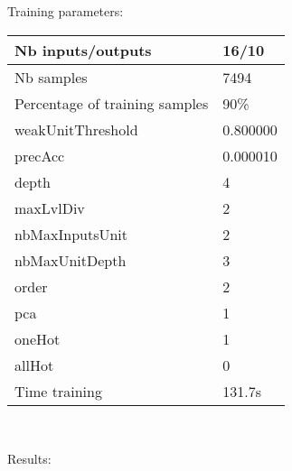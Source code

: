 Training parameters:\\
\begin{center}
\begin{tabular}{|l|l|}
\hline
Nb inputs/outputs&16/10\\
\hline
Nb samples&7494\\
\hline
Percentage of training samples&90\%\\
\hline
weakUnitThreshold&0.800000\\
\hline
precAcc&0.000010\\
\hline
depth&4\\
\hline
maxLvlDiv&2\\
\hline
nbMaxInputsUnit&2\\
\hline
nbMaxUnitDepth&3\\
\hline
order&2\\
\hline
pca&1\\
\hline
oneHot&1\\
\hline
allHot&0\\
\hline
Time training&131.7s\\
\hline
\end{tabular}\\
\end{center}\newline
Results:
